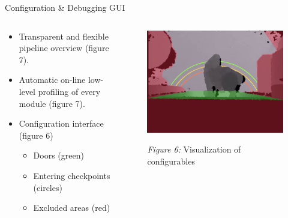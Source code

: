 \documentclass[final,hyperref={pdfpagelabels=false}]{beamer}
\begin{document}
\begin{frame}[t]
\begin{columns}[t]
\begin{column}{.465\textwidth}

\begin{block}{Configuration \& Debugging GUI}

\begin{columns} %
\begin{column}{.54\textwidth} %

\begin{itemize}
\item Transparent and flexible pipeline overview (figure 7).
\item Automatic on-line low-level profiling of every module (figure 7).
\item Configuration interface (figure 6)

\begin{itemize}
\item Doors (green)
\item Entering checkpoints (circles)
\item Excluded areas (red)
\end{itemize}
\end{itemize}

\end{column}

\begin{column}{.43\textwidth} %
\centering
\begin{figure}
\includegraphics[width=0.985\linewidth]{PosterConfigCrop.png}
\label{fig:Config}
\caption{\textit{Figure 6:} Visualization of configurables}
\end{figure}
\end{column}
\end{columns} %


\end{block}
\end{column}
\end{columns}
\end{frame}
\end{document}
